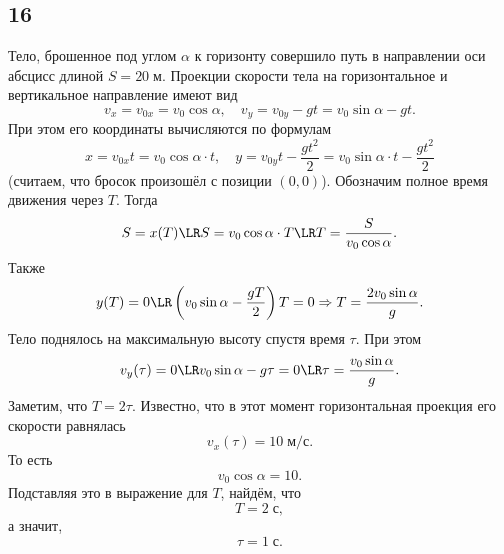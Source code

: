 \subsection{16}

Тело, брошенное под углом $\alpha$ к горизонту совершило путь в направлении оси абсцисс длиной $S=20\;\text{м}$. Проекции скорости тела на горизонтальное и вертикальное направление имеют вид
\begin{equation}\label{eq:16.1}
v_x=v_{0x}=v_0\cos\alpha,\quad v_y=v_{0y}-gt=v_0\sin\alpha-gt.
\end{equation}
При этом его координаты вычисляются по формулам
\begin{equation}\label{eq:16.2}
x=v_{0x}t=v_0\cos\alpha\cdot t,\quad y=v_{0y}t-\frac{gt^2}{2}=v_0\sin\alpha\cdot t-\frac{gt^2}{2}
\end{equation}
\big(считаем, что бросок произошёл с позиции $(0,0)$\big). Обозначим полное время движения через $T$. Тогда
\[
S=x(T)\LR S=v_0\cos\alpha\cdot T\LR T=\frac{S}{v_0\cos\alpha}.
\]
Также
\[
y(T)=0\LR \left(v_0\sin\alpha-\frac{gT}{2}\right)T=0\Rightarrow T=\frac{2v_0\sin\alpha}{g}.
\]
Тело поднялось на максимальную высоту спустя время $\tau$. При этом
\[
v_y(\tau)=0\LR v_0\sin\alpha-g\tau=0\LR\tau=\frac{v_0\sin\alpha}{g}.
\]
Заметим, что $T=2\tau$. Известно, что в этот момент горизонтальная проекция его скорости равнялась
\[
v_x(\tau)=10\;\text{м/с}.
\] 
То есть
\[
v_0\cos\alpha=10.
\]
Подставляя это в выражение для $T$, найдём, что
\[
T=2\;\text{с},
\]
а значит,
\[
\tau=1\;\text{с}.
\]